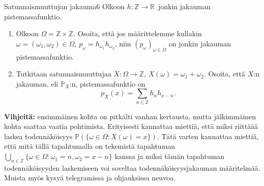 \documentclass[11pt,a4paper]{amsart}
\newcommand{\Z}{\mathbb{Z}}
\newcommand{\R}{\mathbb{R}}
\newcommand{\1}{\mathbf{1}}
\renewcommand{\P}{\mathbb P}
\begin{document}
\begin{Exercises}{Satunnaismuuttujan jakauma}{6}
Olkoon $h: \Z\to \R$ jonkin jakauman pistemassafunktio.
\begin{enumerate}
\item Olkoon $\Omega=\Z\times \Z$. Osoita, että jos määrittelemme kullakin $\omega=(\omega_1,\omega_2)\in \Omega$, $p_\omega=h_{\omega_1}h_{\omega_2}$, niin $(p_\omega)_{\omega \in \Omega}$ on jonkin jakauman pistemassafunktio. 

\item Tutkitaan satunnaismuuttujaa $X:\Omega\to \Z$, $X(\omega)=\omega_1+\omega_2$. Osoita, että $X$:n jakauman, eli $\P_X$:n, pistemassafunktio on 
\[
p_X(x)=\sum_{n\in \Z}h_n h_{x-n}.
\]

\end{enumerate}
{\bf Vihjeitä:} ensimmäinen kohta on pitkälti vanhan kertausta, mutta jälkimmäinen kohta saattaa vaatia pohtimista. Erityisesti kannattaa miettiä, että miksi riittäää laskea todennäköisyys $\P(\{\omega \in \Omega: X(\omega)=x\})$. Tätä varten kannattaa miettiä, että mitä tällä tapahtumalla on tekemistä tapahtuman $\bigcup_{n\in \Z}\{\omega\in \Omega: \omega_1=n, \omega_2=x-n\}$ kanssa ja miksi tämän tapahtuman todennäköisyyden laskemiseen voi soveltaa todennäköisyysjakauman määritelmää. Muista myös kysyä telegramissa ja ohjauksissa neuvoa. 
\end{Exercises}
\end{document}

